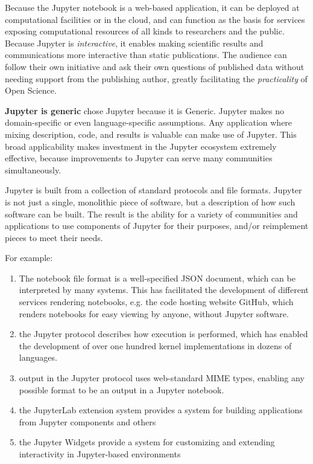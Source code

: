 
Because the Jupyter notebook is a web-based application, it can be
deployed at computational facilities or in the cloud, and can function
as the basis for services exposing computational resources of all
kinds to researchers and the public.  Because Jupyter is
\textit{interactive}, it enables making scientific results and
communications more interactive than static publications.  The
audience can follow their own initiative and ask their own questions
of published data without needing support from the publishing author,
greatly facilitating the \textit{practicality} of Open Science.

\textbf{Jupyter is generic} \TheProject chose Jupyter because it is
Generic.  Jupyter makes no domain-specific or even language-specific
assumptions.  Any application where mixing description, code, and
results is valuable can make use of Jupyter.  This broad applicability
makes investment in the Jupyter ecosystem extremely effective, because
improvements to Jupyter can serve many communities simultaneously.

Jupyter is built from a collection of standard protocols and file
formats.  Jupyter is not just a single, monolithic piece of
software, but a description of how such software can be built.  The
result is the ability for a variety of communities and applications to
use components of Jupyter for their purposes, and/or reimplement pieces to
meet their needs.

For example:

\begin{enumerate}
\item The notebook file format is a well-specified JSON document,
  which can be interpreted by many systems.  This has facilitated the
  development of different services rendering notebooks, e.g. the code
  hosting website GitHub, which renders notebooks for easy viewing by
  anyone, without Jupyter software.
\item the Jupyter protocol describes how execution is performed, which
  has enabled the development of over one hundred kernel
  implementations in dozens of languages.
\item output in the Jupyter protocol uses web-standard MIME types,
  enabling any possible format to be an output in a Jupyter notebook.
\item the JupyterLab extension system provides a system for building
  applications from Jupyter components and others
\item the Jupyter Widgets provide a system for customizing and
  extending interactivity in Jupyter-based environments
\end{enumerate}

